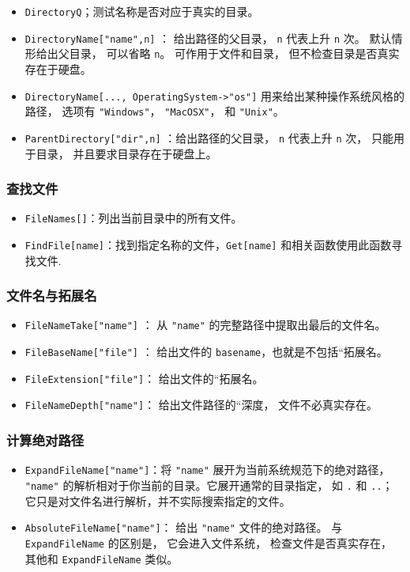 \begin{itemize}
\item \verb`DirectoryQ`；测试名称是否对应于真实的目录。
\item \verb`DirectoryName["name",n]` ： 给出路径的父目录， \verb`n` 代表上升 \verb`n` 次。 
默认情形给出父目录， 可以省略 \verb`n`。 可作用于文件和目录， 但不检查目录是否真实存在于硬盘。
\item \verb`DirectoryName[..., OperatingSystem->"os"]` 用来给出某种操作系统风格的路径， 
选项有 \verb`"Windows"`， \verb`"MacOSX"`， 和 \verb`"Unix"`。
\item \verb`ParentDirectory["dir",n]` ：给出路径的父目录， \verb`n` 代表上升 \verb`n` 次， 
只能用于目录， 并且要求目录存在于硬盘上。
\end{itemize}

\subsubsection{查找文件}

\begin{itemize}
\item \verb`FileNames[]`：列出当前目录中的所有文件。
\item \verb`FindFile[name]`：找到指定名称的文件，\verb`Get[name]` 和相关函数使用此函数寻找文件.
\end{itemize}

\subsubsection{文件名与拓展名}

\begin{itemize}
\item \verb`FileNameTake["name"]` ： 从 \verb`"name"` 的完整路径中提取出最后的文件名。
\item \verb`FileBaseName["file"]` ： 给出文件的 \verb`basename`，也就是不包括“拓展名。
\item \verb`FileExtension["file"]`： 给出文件的“拓展名。
\item \verb`FileNameDepth["name"]`： 给出文件路径的“深度， 文件不必真实存在。
\end{itemize}

\subsubsection{计算绝对路径}

\begin{itemize}
\item \verb`ExpandFileName["name"]`：将 \verb`"name"` 展开为当前系统规范下的绝对路径， 
\verb`"name"` 的解析相对于你当前的目录。它展开通常的目录指定， 如 \verb`.` 和 \verb`..`；
它只是对文件名进行解析，并不实际搜索指定的文件。
\item \verb`AbsoluteFileName["name"]`： 给出 \verb`"name"` 文件的绝对路径。 
与 \verb`ExpandFileName` 的区别是， 它会进入文件系统， 检查文件是否真实存在，
其他和 \verb`ExpandFileName` 类似。
\end{itemize}

